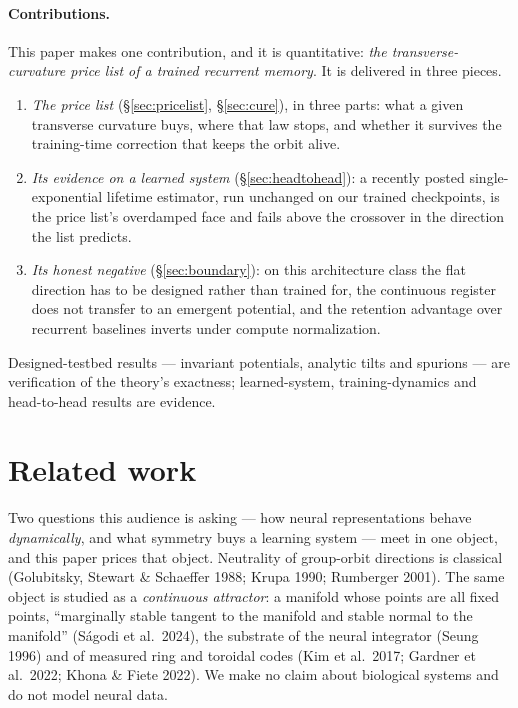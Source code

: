 \documentclass{article}
\begin{document}
\paragraph{Contributions.} This paper makes one contribution, and it is quantitative: \emph{the transverse-curvature price list of a
trained recurrent memory}. It is delivered in three pieces.
\begin{enumerate}
\item \emph{The price list} (\S\ref{sec:pricelist}, \S\ref{sec:cure}), in three parts: what a given transverse curvature buys, where
that law stops, and whether it survives the training-time correction that keeps the orbit alive.
\item \emph{Its evidence on a learned system} (\S\ref{sec:headtohead}): a recently posted single-exponential lifetime estimator, run
unchanged on our trained checkpoints, is the price list's overdamped face and fails above the crossover in the direction the list predicts.
\item \emph{Its honest negative} (\S\ref{sec:boundary}): on this architecture class the flat direction has to be designed rather than
trained for, the continuous register does not transfer to an emergent potential, and the retention advantage over recurrent baselines
inverts under compute normalization.
\end{enumerate}
Designed-testbed results --- invariant potentials, analytic tilts and spurions --- are verification of the theory's exactness;
learned-system, training-dynamics and head-to-head results are evidence.

\section{Related work}\label{sec:related}

Two questions this audience is asking --- how neural representations behave \emph{dynamically}, and what symmetry buys a learning system --- meet in one object, and this paper prices that object. Neutrality of group-orbit directions is classical (Golubitsky, Stewart \& Schaeffer 1988; Krupa 1990; Rumberger 2001). The same object is studied as a \emph{continuous attractor}: a manifold whose points are all fixed points, ``marginally stable tangent to the manifold and stable normal to the manifold'' (S\'agodi et al.\ 2024), the substrate of the neural integrator (Seung 1996) and of measured ring and toroidal codes (Kim et al.\ 2017; Gardner et al.\ 2022; Khona \& Fiete 2022). We make no claim about biological systems and do not model neural data.
\end{document}
